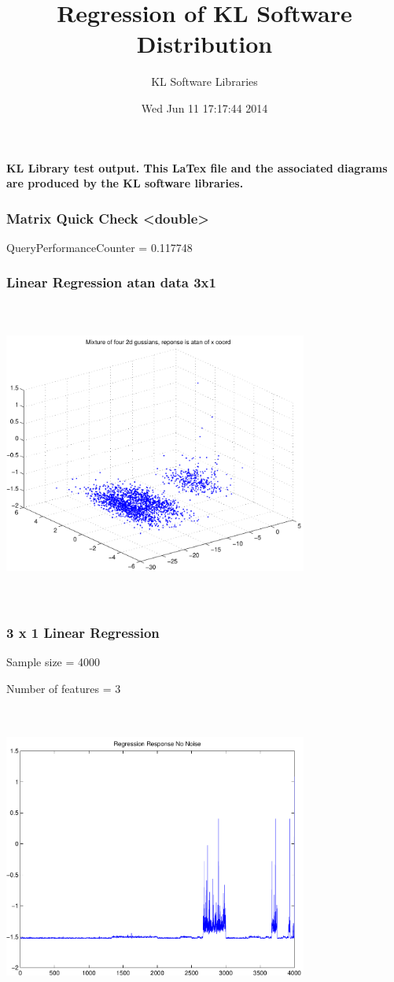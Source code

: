 \documentclass[9pt]{article}
\theoremstyle{plain}
\theoremstyle{definition}
\theoremstyle{remark}
\numberwithin{equation}{section}
\begin{document}
\title{Regression of KL Software Distribution   }
\author{KL Software Libraries}
\date{Wed Jun 11 17:17:44 2014
}
\maketitle
\textbf{ KL Library test output.  This LaTex file and the associated diagrams are produced by the KL software libraries.}
\subsubsection{Matrix Quick Check <double>}
QueryPerformanceCounter  =  0.117748
\subsubsection{Linear Regression atan data 3x1}
\includegraphics[width=10.0cm,height=10.0cm]{AtanDataSet.pdf}

\subsubsection{3 x 1 Linear Regression}
Sample size = 4000

Number of features = 3

\includegraphics[width=10.0cm,height=10.0cm]{AtanDataSet_regression_response_no_noise.pdf}
\end{document}

